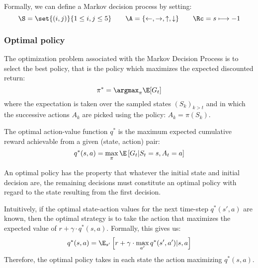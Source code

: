 Formally, we can define a Markov decision process by setting:
\begin{equation*}
    \S=\set{(i,j)}{1\leq i,j\leq5} \qquad \A=\{\leftarrow,\rightarrow,\uparrow,\downarrow\} \qquad \Rc=s\longmapsto-1
\end{equation*}


\subsubsection{Optimal policy}
The optimization problem associated with the Markov Decision Process is to select the best policy, that is the policy which maximizes the expected discounted return:
\begin{equation}
    \pi^*=\argmax_\pi \E[G_t]
\end{equation}
where the expectation is taken over the sampled states $(S_k)_{k>t}$ and in which the successive actions $A_k$ are picked using the policy: $A_k=\pi(S_k)$.

\begin{definition}
    The optimal action-value function $q^*$ is the maximum expected cumulative reward achievable from a given (state, action) pair:
    \begin{equation*}
        q^*(s,a) = \max_\pi\E\left[G_t|S_t=s,A_t=a\right]
    \end{equation*}
\end{definition}

\begin{theorem}
    An optimal policy has the property that whatever the initial state and initial decision are, the remaining decisions must constitute an optimal policy with regard to the state resulting from the first decision.
\end{theorem}

\begin{property}
    Intuitively, if the optimal state-action values for the next time-step $q^*(s',a)$ are known, then the optimal strategy is to take the action that maximizes the expected value of $r+ \gamma\cdot q^*(s, a)$. Formally, this gives us:
    \begin{equation}
        q^*(s,a) = \E_{s'}\left[r+\gamma\cdot\max_{a'}q^*(s',a')|s,a\right]
    \end{equation}
    Therefore, the optimal policy takes in each state the action maximizing $q^*(s,a)$.
\end{property}

